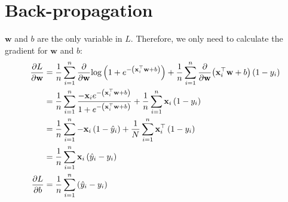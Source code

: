 \documentclass{article}
\begin{document}
\section{Back-propagation}
$\mathbf{w}$ and $b$ are the only variable in $L$. Therefore, we only need to calculate the gradient for $\mathbf{w}$ and $b$:
\begin{align}
    \frac{\partial L}{\partial\mathbf{w}} &= \frac{1}{n}\sum_{i = 1}^{n}{\frac{\partial}{\partial\mathbf{w}}{\log\left(1 + e^{-\left(\mathbf{x}^\top_i\mathbf{w} + b\right)}\right)}} + \frac{1}{n}\sum_{i = 1}^{n}{\frac{\partial}{\partial\mathbf{w}}{\left(\mathbf{x}^\top_i\mathbf{w} + b\right)\left(1 - y_i\right)}} \\
    &= \frac{1}{n}\sum_{i = 1}^{n}{\frac{-\mathbf{x}_ie^{-\left(\mathbf{x}^\top_i\mathbf{w} + b\right)}}{1 + e^{-\left(\mathbf{x}^\top_i\mathbf{w} + b\right)}}} + \frac{1}{n}\sum_{i = 1}^{n}{\mathbf{x}_i\left(1 - y_i\right)} \\
    &= \frac{1}{n}\sum_{i = 1}^{n}{-\mathbf{x}_i\left(1 - \hat{y}_i\right)} + \frac{1}{N}\sum_{i = 1}^{n}{\mathbf{x}_i^\top\left(1 - y_i\right)} \\
    &= \frac{1}{n}\sum_{i = 1}^{n}{\mathbf{x}_i\left(\hat{y}_i - y_i\right)} \\
    \frac{\partial L}{\partial b} &= \frac{1}{n}\sum_{i = 1}^{n}{\left(\hat{y}_i - y_i\right)}
\end{align}
\end{document}

